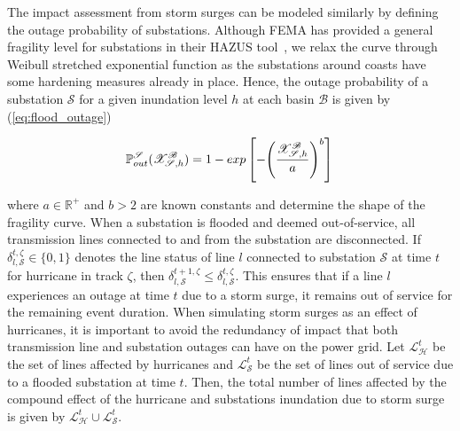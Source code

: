 The impact assessment from storm surges can be modeled similarly by defining the outage probability of substations. Although FEMA has provided a general fragility level for substations in their HAZUS tool~\cite{hazus_flood}, we relax the curve through Weibull stretched exponential function as the substations around coasts have some hardening measures already in place. Hence, the outage probability of a substation $\mathcal{S}$ for a given inundation level $h$ at each basin $\mathcal{B}$ is given by (\ref{eq:flood_outage})

\vspace{-1em}
\begin{equation} 
\small
\mathbb{P}^{\mathcal{S}}_{out}(\mathcal{X}^\mathcal{B}_{\mathcal{S}, h}) = 1 - exp\left[- {\left(\frac{\mathcal{X}^\mathcal{B}_{\mathcal{S}, h}}{a}\right)^b}\right] \\
\label{eq:flood_outage}
\end{equation}

\noindent
where $a\in \mathbb{R}^+$ and $b>2$ are known constants and determine the shape of the fragility curve. When a substation is flooded and deemed out-of-service, all transmission lines connected to and from the substation are disconnected. If $\delta_{l,\mathcal{S}}^{t,\zeta} \in \{0,1\}$ denotes the line status of line $l$ connected to substation $\mathcal{S}$ at time $t$ for hurricane in track $\zeta$, then $\delta_{l, \mathcal{S}}^{t + 1,\zeta} \leq  \delta_{l,\mathcal{S}}^{t,\zeta}$. This ensures that if a line $l$ experiences an outage at time $t$ due to a storm surge, it remains out of service for the remaining event duration. 
When simulating storm surges as an effect of hurricanes, it is important to avoid the redundancy of impact that both transmission line and substation outages can have on the power grid. Let $\mathcal{L}^t_\mathcal{H}$ be the set of lines affected by hurricanes and $\mathcal{L}^t_\mathcal{S}$ be the set of lines out of service due to a flooded substation at time $t$. Then, the total number of lines affected by the compound effect of the hurricane and substations inundation due to storm surge is given by $\mathcal{L}^t_\mathcal{H} \cup \mathcal{L}^t_\mathcal{S}$.  


